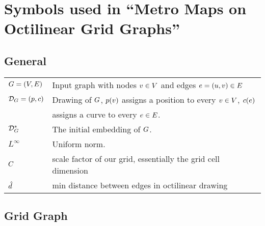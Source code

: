 \documentclass{article}
\makeatletter
\newenvironment{eqdesc}
  {\par\vspace{\abovedisplayskip}\noindent\begin{tabular}{>{$}l<{$} @{${}\hspace{0.6cm}{}$} l}}
  {\end{tabular}\par\vspace{\belowdisplayskip}}
\makeatother
\begin{document}
\section{Symbols used in ``Metro Maps on Octilinear Grid Graphs''}


\subsection{General}

\begin{eqdesc}
	\iG = (\iV, \iE)     &  Input graph with nodes $v \in V$ and edges $e = (u, v) \in E$ \\
	\drawing{\iG} = (\drawingpossym, \drawingcurvesym)     &  Drawing of $G$, $p(v)$ assigns a position to every $v \in V$, $c(e)$ \\
	 & assigns a curve to every $e \in E$. \\   
	\initdrawing{\iG} &  The initial embedding of $G$. \\
	L^{\infty} & Uniform norm. \\
	\gScale & scale factor of our grid, essentially the grid cell dimension \\
	\gmind & min distance between edges in octilinear drawing
\end{eqdesc}

\subsection{Grid Graph}
\end{document}
